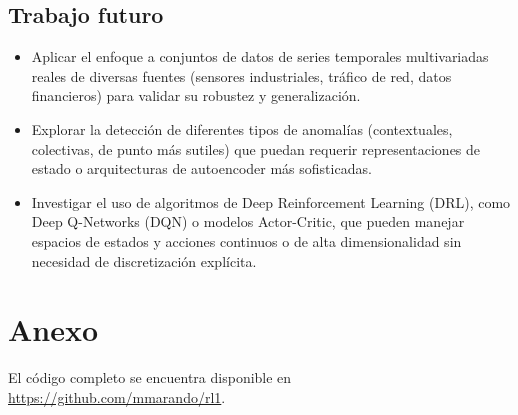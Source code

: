 \documentclass[12pt]{article}
\begin{document}
\subsection{Trabajo futuro}

\begin{itemize}
    \item Aplicar el enfoque a conjuntos de datos de series temporales multivariadas reales de diversas fuentes (sensores industriales, tráfico de red, datos financieros) para validar su robustez y generalización.
    \item Explorar la detección de diferentes tipos de anomalías (contextuales, colectivas, de punto más sutiles) que puedan requerir representaciones de estado o arquitecturas de autoencoder más sofisticadas.
    \item Investigar el uso de algoritmos de Deep Reinforcement Learning (DRL), como Deep Q-Networks (DQN) o modelos Actor-Critic, que pueden manejar espacios de estados y acciones continuos o de alta dimensionalidad sin necesidad de discretización explícita.
\end{itemize}


\newpage
\section*{Anexo}
El código completo se encuentra disponible en \url{https://github.com/mmarando/rl1}.
\end{document}
